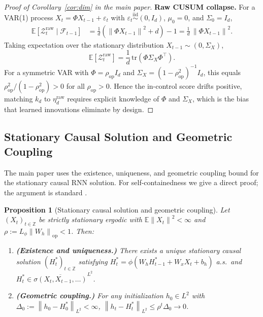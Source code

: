 \documentclass[bj,authoryear]{imsart}
\theoremstyle{plain}
\newtheorem{proposition}[theorem]{Proposition}
\theoremstyle{definition}
\newcommand{\E}{\mathbb{E}}
\newcommand{\F}{\mathcal{F}}
\newcommand{\Z}{\mathbb{Z}}
\newcommand{\norm}[1]{\left\lVert #1 \right\rVert}
\newcommand{\given}{\mid}
\newcommand{\iid}{\overset{\mathrm{iid}}{\sim}}
\begin{document}
\begin{proof}[Proof of Corollary~\ref{cor:dim} in the main paper]
  \textbf{Raw CUSUM collapse.}
  For a VAR(1) process $X_t = \Phi X_{t-1} + \varepsilon_t$ with
  $\varepsilon_t \iid (0, I_d)$, $\mu_0 = 0$, and $\Sigma_0 = I_d$,
  \begin{align*}
    \E\!\left[\mathcal{Z}_t^{\mathrm{raw}}\given\F_{t-1}\right]
    &= \frac{1}{d}\!\left(\norm{\Phi X_{t-1}}^2 + d\right) - 1
     = \frac{1}{d}\,\norm{\Phi X_{t-1}}^2.
  \end{align*}
  Taking expectation over the stationary distribution $X_{t-1} \sim (0, \Sigma_X)$,
  \[
    \E\!\left[\mathcal{Z}_t^{\mathrm{raw}}\right]
    = \frac{1}{d}\,\mathrm{tr}(\Phi\Sigma_X\Phi^\top).
  \]
  For a symmetric VAR with $\Phi = \rho_{\mathrm{op}} I_d$ and
  $\Sigma_X = (1-\rho_{\mathrm{op}}^2)^{-1}I_d$, this equals
  $\rho_{\mathrm{op}}^2/(1-\rho_{\mathrm{op}}^2) > 0$ for all $\rho_{\mathrm{op}} > 0$.
  Hence the in-control score drifts positive, matching $k_d$ to
  $\eta_d^{\mathrm{raw}}$ requires explicit knowledge of $\Phi$ and $\Sigma_X$,
  which is the bias that learned innovations eliminate by design.
\end{proof}

\subsection{Stationary Causal Solution and Geometric Coupling}
\label{app:stationary-causal}

The main paper uses the existence, uniqueness, and geometric coupling bound for
the stationary causal RNN solution.  For self-containedness we give a direct
proof; the argument is standard \citep{doukhan1994mixing}.

\begin{proposition}[Stationary causal solution and geometric coupling]
\label{prop:stationary-causal}
  Let $(X_t)_{t\in\Z}$ be strictly stationary ergodic with
  $\E\norm{X_t}^2<\infty$ and $\rho:=L_\phi\norm{W_h}_{\mathrm{op}}<1$.
  Then:
  \begin{enumerate}[label=(\roman*)]
    \item \textbf{(Existence and uniqueness.)}
      There exists a unique stationary causal solution $(H_t^*)_{t\in\Z}$
      satisfying $H_t^*=\phi(W_hH_{t-1}^*+W_xX_t+b_h)$ a.s.\ and
      $H_t^*\in\overline{\sigma(X_t,X_{t-1},\ldots)}^{L^2}$.
    \item \textbf{(Geometric coupling.)}
      For any initialization $h_0\in L^2$ with
      $\Delta_0:=\norm{h_0-H_0^*}_{L^2}<\infty$,
      $\norm{h_t-H_t^*}_{L^2}\leq\rho^t\Delta_0 \to 0$.
  \end{enumerate}
\end{proposition}
\end{document}
